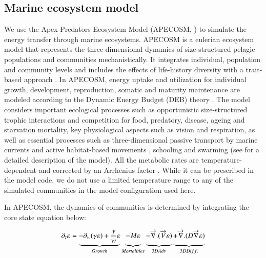 
\subsection{Marine ecosystem model}
\label{sec:apecosm}

We use the Apex Predators Ecosystem Model (APECOSM, \citealp{mauryModelingEnvironmentalEffects2007, mauryOverviewAPECOSMSpatialized2010}) to simulate the energy transfer through marine ecosystems. 
APECOSM is a eulerian ecosystem model that represents the three-dimensional dynamics of size-structured pelagic populations and communities mechanistically. It integrates individual, population and community levels and includes the effects of life-history diversity with a trait-based approach \citep{mauryIndividualsPopulationsCommunities2013}. In APECOSM, energy uptake and utilization for individual growth, development, reproduction, somatic and maturity maintenance are modeled according to the Dynamic Energy Budget (DEB) theory \citep{koojmanDynamicEnergyBudget2010}. The model considers important ecological processes such as opportunistic size-structured trophic interactions and competition for food, predatory, disease, ageing and starvation mortality, key physiological aspects such as vision and respiration, as well as essential processes such as three-dimensional passive transport by marine currents and active habitat-based movements \citep{faugerasAdvectiondiffusionreactionSizestructuredFish2005}, schooling and swarming (see \citealp{mauryModelingEnvironmentalEffects2007, mauryIndividualsPopulationsCommunities2013, mauryCanSchoolingRegulate2017} for a detailed description of the model). 
 All the metabolic rates are temperature-dependent and corrected by an Arrhenius factor \citep{mauryModelingEnvironmentalEffects2007, mauryIndividualsPopulationsCommunities2013}. While it can be prescribed in the model code, we do not use a limited temperature range to any of the simulated communities in the model configuration used here.

In APECOSM, the dynamics of communities is determined by integrating the core state equation below:

\begin{equation}
\partial_t \varepsilon = \underbrace{- \partial_w(\gamma \varepsilon) + \frac{\gamma}{w}\varepsilon}_{Growth} 
\underbrace{- M \varepsilon \vphantom{\frac{\gamma}{w}\varepsilon}}_{Mortalities}
\underbrace{-\overrightarrow{\nabla}.(\overrightarrow{V} \varepsilon) \vphantom{\frac{\gamma}{w}\varepsilon}}_{3D Adv} 
\underbrace{+ \overrightarrow{\nabla} . (D \overrightarrow{\nabla} \varepsilon) \vphantom{\frac{\gamma}{w}\varepsilon}}_{3D Diff.}
\label{eq:apecosm_trend}
\end{equation}

